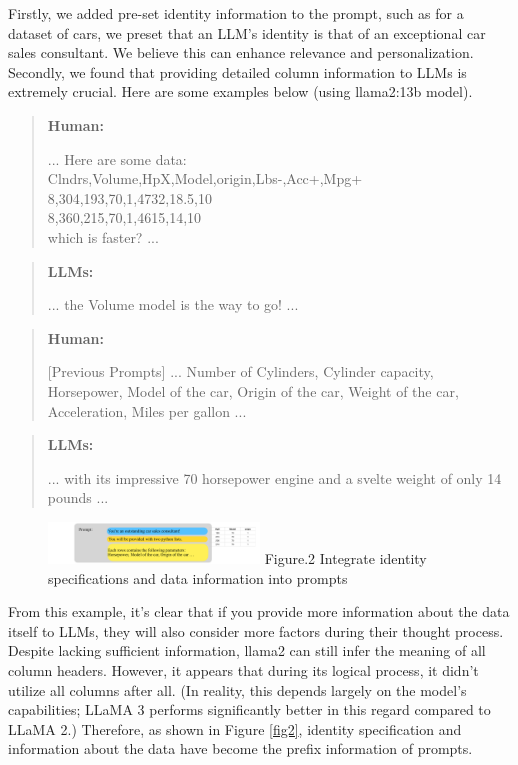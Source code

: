 \documentclass{ieeeaccess}
\newenvironment{human}{
    \begin{quote}
    \textbf{Human:}
}{\end{quote}}
\newenvironment{chatgpt}{
    \begin{quote}
    \textbf{LLMs:}
}{\end{quote}}
\begin{document}
Firstly, we added pre-set identity information to the prompt, such as for a dataset of cars, we preset that an LLM's identity is that of an exceptional car sales consultant. We believe this can enhance relevance and personalization. Secondly, we found that providing detailed column information to LLMs is extremely crucial. Here are some examples below (using llama2:13b model).

\begin{human}
 ... Here are some data: \\
 Clndrs,Volume,HpX,Model,origin,Lbs-,Acc+,Mpg+ \\
 8,304,193,70,1,4732,18.5,10 \\
 8,360,215,70,1,4615,14,10 \\
 which is faster? ...
\end{human}

\begin{chatgpt}
 ... the Volume model is the way to go! ...
\end{chatgpt}

\begin{human}
    [Previous Prompts] ... Number of Cylinders, Cylinder capacity, Horsepower, Model of the car, Origin of the car, Weight of the car, Acceleration, Miles per gallon ...
\end{human}

\begin{chatgpt}
    ... with its impressive 70 horsepower engine and a svelte weight of only 14 pounds ...
\end{chatgpt}
\begin{figure}[ht]
    \centering
    \includegraphics[page=1,width=0.5\textwidth]{llm1.pdf}
    Figure.2 Integrate identity specifications and data information into prompts \label{fig.2}
  \end{figure}
 

From this example, it's clear that if you provide more information about the data itself to LLMs, they will also consider more factors during their thought process. Despite lacking sufficient information, llama2 can still infer the meaning of all column headers. However, it appears that during its logical process, it didn't utilize all columns after all. (In reality, this depends largely on the model's capabilities; LLaMA 3 performs significantly better in this regard compared to LLaMA 2.) Therefore, as shown in Figure \ref{fig2}, identity specification and information about the data have become the prefix information of prompts.
\end{document}
